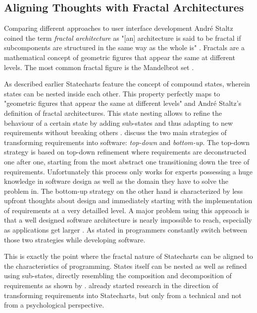 \subsection{Aligning Thoughts with Fractal Architectures}
\label{sub:aligning-thoughts-with-fractal-architectures}
Comparing different approaches to user interface development André Staltz coined the term \emph{fractal architecture} as "[an] architecture is said to be fractal if subcomponents are structured in the same way as the whole is" \autocite{staltz_unidirectional_2015}.
Fractals are a mathematical concept of geometric figures that appear the same at different levels.
The most common fractal figure is the Mandelbrot set \autocite{mandelbrot_fractal_1982}.

As described earlier Statecharts feature the concept of compound states, wherein states can be nested inside each other.
This property perfectly maps to "geometric figures that appear the same at different levels" and André Staltz's definition of fractal architectures.
This state nesting allows to refine the behaviour of a certain state by adding sub-states and thus adapting to new requirements without breaking others \autocite{harel_statecharts:_1987}.
\autocite{leveson_experiences_1991} discuss the two main strategies of transforming requirements into software: \emph{top-down} and \emph{bottom-up}.
The top-down strategy is based on top-down refinement where requirements are deconstructed one after one, starting from the most abstract one transitioning down the tree of requirements.
Unfortunately this process only works for experts possessing a huge knowledge in software design as well as the domain they have to solve the problem in.
The bottom-up strategy on the other hand is characterized by less upfront thoughts about design and immediately starting with the implementation of requirements at a very detailled level.
A major problem using this approach is that a well designed software architecture is nearly impossible to reach, especially as applications get larger \autocite{horrocks_constructing_1999}.
As stated in \autocite{leveson_experiences_1991} programmers constantly switch between those two strategies while developing software.

This is exactly the point where the fractal nature of Statecharts can be aligned to the characteristics of programming.
States itself can be nested as well as refined using sub-states, directly resembling the composition and decomposition of requirements as shown by \textcite{leveson_experiences_1991}.
\textcite{glinz_statecharts_2002} already started research in the direction of transforming requirements into Statecharts, but only from a technical and not from a psychological perspective.


